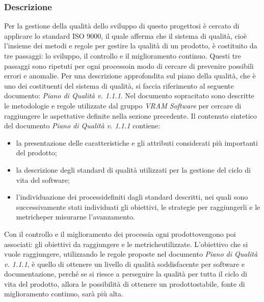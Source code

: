 \subsubsection{Descrizione}
Per la gestione della qualità dello sviluppo di questo progetto\glosp si è cercato di applicare lo standard ISO 9000, il quale afferma che il sistema di qualità, cioè l'insieme dei metodi e regole per gestire la qualità di un prodotto\glo, è costituito da tre passaggi: lo sviluppo, il controllo e il miglioramento continuo. Questi tre passaggi sono ripetuti per ogni processo\glosp in modo di cercare di prevenire possibili errori e anomalie.
Per una descrizione approfondita sul piano della qualità, che è uno dei costituenti del sistema di qualità, si faccia riferimento al seguente documento: \textit{Piano di Qualità v. 1.1.1}.
Nel documento sopracitato sono descritte le metodologie e regole utilizzate dal gruppo \textit{VRAM Software} per cercare di raggiungere le aspettative definite nella sezione precedente.
Il contenuto sintetico del documento \textit{Piano di Qualità v. 1.1.1} contiene:
\begin{itemize}
	\item la presentazione delle caratteristiche e gli attributi considerati più importanti del prodotto\glo;
	\item la descrizione degli standard di qualità utilizzati per la gestione del ciclo di vita del software;
	\item l'individuazione dei processi\glosp definiti dagli standard descritti, nei quali sono successivamente stati individuati gli obiettivi, le strategie per raggiungerli e le metriche\glosp per misurarne l'avanzamento.
\end{itemize}
Con il controllo e il miglioramento dei processi\glosp a ogni prodotto\glosp vengono poi associati: gli obiettivi da raggiungere e le metriche\glosp utilizzate.
L'obiettivo che si vuole raggiungere, utilizzando le regole proposte nel documento \textit{Piano di Qualità v. 1.1.1}, è quello di ottenere un livello di qualità soddisfacente per software e documentazione, perché se si riesce a perseguire la qualità per tutta il ciclo di vita del prodotto\glo, allora le possibilità di ottenere un prodotto\glosp stabile, fonte di miglioramento continuo, sarà più alta.
